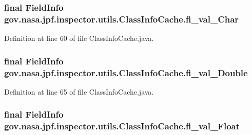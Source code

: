 \subsubsection[{\texorpdfstring{fi\+\_\+val\+\_\+\+Char}{fi_val_Char}}]{\setlength{\rightskip}{0pt plus 5cm}final Field\+Info gov.\+nasa.\+jpf.\+inspector.\+utils.\+Class\+Info\+Cache.\+fi\+\_\+val\+\_\+\+Char}\hypertarget{classgov_1_1nasa_1_1jpf_1_1inspector_1_1utils_1_1_class_info_cache_aea9bf6c31321099b540447bedeb94b2a}{}\label{classgov_1_1nasa_1_1jpf_1_1inspector_1_1utils_1_1_class_info_cache_aea9bf6c31321099b540447bedeb94b2a}


Definition at line 60 of file Class\+Info\+Cache.\+java.

\subsubsection[{\texorpdfstring{fi\+\_\+val\+\_\+\+Double}{fi_val_Double}}]{\setlength{\rightskip}{0pt plus 5cm}final Field\+Info gov.\+nasa.\+jpf.\+inspector.\+utils.\+Class\+Info\+Cache.\+fi\+\_\+val\+\_\+\+Double}\hypertarget{classgov_1_1nasa_1_1jpf_1_1inspector_1_1utils_1_1_class_info_cache_af61ba32762e96ce41560e60090adef79}{}\label{classgov_1_1nasa_1_1jpf_1_1inspector_1_1utils_1_1_class_info_cache_af61ba32762e96ce41560e60090adef79}


Definition at line 65 of file Class\+Info\+Cache.\+java.

\subsubsection[{\texorpdfstring{fi\+\_\+val\+\_\+\+Float}{fi_val_Float}}]{\setlength{\rightskip}{0pt plus 5cm}final Field\+Info gov.\+nasa.\+jpf.\+inspector.\+utils.\+Class\+Info\+Cache.\+fi\+\_\+val\+\_\+\+Float}\hypertarget{classgov_1_1nasa_1_1jpf_1_1inspector_1_1utils_1_1_class_info_cache_acd25f423b76e59654fb7b80eba3084e6}{}\label{classgov_1_1nasa_1_1jpf_1_1inspector_1_1utils_1_1_class_info_cache_acd25f423b76e59654fb7b80eba3084e6}


